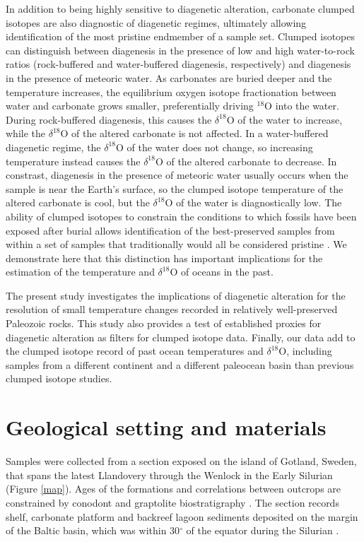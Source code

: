 \documentclass{article}
\newcommand{\deltao}{$\delta^{18}$}
\begin{document}
In addition to being highly sensitive to diagenetic alteration, carbonate clumped isotopes are also diagnostic of diagenetic regimes, ultimately allowing identification of the most pristine endmember of a sample set. Clumped isotopes can distinguish between diagenesis in the presence of low and high water-to-rock ratios (rock-buffered and water-buffered diagenesis, respectively) and diagenesis in the presence of meteoric water. As carbonates are buried deeper and the temperature increases, the equilibrium oxygen isotope fractionation between water and carbonate grows smaller, preferentially driving $^{18}$O into the water. During rock-buffered diagenesis, this causes the \deltao O of the water to increase, while the \deltao O of the altered carbonate is not affected. In a water-buffered diagenetic regime, the \deltao O of the water does not change, so increasing temperature instead causes the \deltao O of the altered carbonate to decrease. In constrast, diagenesis in the presence of meteoric water usually occurs when the sample is near the Earth's surface, so the clumped isotope temperature of the altered carbonate is cool, but the \deltao O of the water is diagnostically low. The ability of clumped isotopes to constrain the conditions to which fossils have been exposed after burial allows identification of the best-preserved samples from within a set of samples that traditionally would all be considered pristine \citep{Eiler2011}. We demonstrate here that this distinction has important implications for the estimation of the temperature and \deltao O of oceans in the past.  

The present study investigates the implications of diagenetic alteration for the resolution of small temperature changes recorded in relatively well-preserved Paleozoic rocks. This study also provides a test of established proxies for diagenetic alteration as filters for clumped isotope data. Finally, our data add to the clumped isotope record of past ocean temperatures and \deltao O, including samples from a different continent and a different paleocean basin than previous clumped isotope studies. 

\section{Geological setting and materials}

Samples were collected from a section exposed on the island of Gotland, Sweden, that spans the latest Llandovery through the Wenlock in the Early Silurian (Figure \ref{map}). Ages of the formations and correlations between outcrops are constrained by conodont and graptolite biostratigraphy \citep{Jeppsson2006}. The section records shelf, carbonate platform and backreef lagoon sediments deposited on the margin of the Baltic basin, which was within 30$^{\circ}$ of the equator during the Silurian \citep{Torsvik1992}. 
\end{document}
